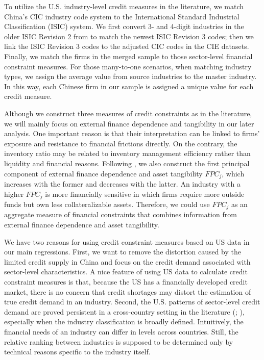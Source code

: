 To utilize the U.S. industry-level credit measures in the literature, we match China's CIC industry code system to the International Standard Industrial Classification (ISIC) system. We first convert 3- and 4-digit industries in the older ISIC Revision 2 from \cite{manova-wei-zhang2015} to match the newest ISIC Revision 3 codes; then we link the ISIC Revision 3 codes to the adjusted CIC codes in the CIE datasets. Finally, we match the firms in the merged sample to those sector-level financial constraint measures. For those many-to-one scenarios, when matching industry types, we assign the average value from source industries to the master industry. In this way, each Chinese firm in our sample is assigned a unique value for each credit measure.

Although we construct three measures of credit constraints as in the literature, we will mainly focus on external finance dependence and tangibility in our later analysis. One important reason is that their interpretation can be linked to firms' exposure and resistance to financial frictions directly. On the contrary, the inventory ratio may be related to inventory management efficiency rather than liquidity and financial reasons. Following \cite{manova-wei-zhang2015}, we also construct the first principal component of external finance dependence and asset tangibility $FPC_j$, which increases with the former and decreases with the latter. An industry with a higher $FPC_j$ is more financially sensitive in which firms require more outside funds but own less collateralizable assets. Therefore, we could use $FPC_j$ as an aggregate measure of financial constraints that combines information from external finance dependence and asset tangibility.

We have two reasons for using credit constraint measures based on US data in our main regressions. First, we want to remove the distortion caused by the limited credit supply in China and focus on the credit demand associated with sector-level characteristics. A nice feature of using US data to calculate credit constraint measures is that, because the US has a financially developed credit market, there is no concern that credit shortages may distort the estimation of true credit demand in an industry. Second, the U.S. patterns of sector-level credit demand are proved persistent in a cross-country setting in the literature (\cite{manova-wei-zhang2015}; \cite{fan-lai-li2015}), especially when the industry classification is broadly defined. Intuitively, the financial needs of an industry can differ in levels across countries. Still, the relative ranking between industries is supposed to be determined only by technical reasons specific to the industry itself.


